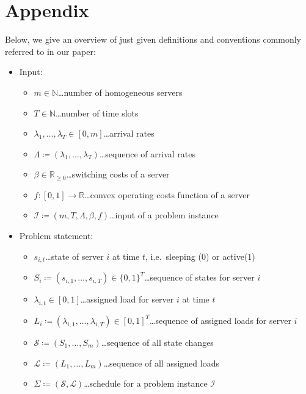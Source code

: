 \documentclass[hidelinks]{article}
\theoremstyle{plain}
\theoremstyle{definition}
\theoremstyle{rem}
\newcommand{\inp}{\mathcal{I}}
\begin{document}
\newpage


\newpage

\section*{Appendix}
Below, we give an overview of just given definitions and conventions commonly referred to in our paper:
\begin{itemize}
\item Input:
\begin{itemize}
	\item $m\in\mathbb{N}$\ldots number of homogeneous servers
	\item $T\in\mathbb{N}$\ldots number of time slots
	\item $\lambda_1,\ldots,\lambda_{T}\in[0,m]$\ldots arrival rates
	\item $\Lambda\coloneqq(\lambda_1,\ldots,\lambda_T)$\ldots sequence of arrival rates
	\item $\beta\in\mathbb{R}_{\ge 0}$\ldots switching costs of a server
	\item $f:[0,1]\rightarrow\mathbb{R}$\ldots convex operating costs function of a server
	\item $\inp\coloneqq(m,T,\Lambda,\beta,f)$\ldots input of a problem instance
\end{itemize}

\item Problem statement:
\begin{itemize}
	\item $s_{i,t}$\ldots state of server $i$ at time $t$, i.e.\ sleeping (0) or active(1)
	\item $S_i\coloneqq(s_{i,1},\ldots,s_{i,T})\in\{0,1\}^T$\ldots sequence of states for server $i$
	\item $\lambda_{i,t}\in[0,1]$\ldots assigned load for server $i$ at time $t$
	\item $L_i\coloneqq(\lambda_{i,1},\ldots,\lambda_{i,T})\in[0,1]^T$\ldots sequence of assigned loads for server $i$
	\item $\mathcal{S}\coloneqq(S_1,\ldots,S_m)$\ldots sequence of all state changes
	\item $\mathcal{L}\coloneqq(L_1,\ldots,L_m)$\ldots sequence of all assigned loads
	\item $\Sigma\coloneqq(\mathcal{S},\mathcal{L})$\ldots schedule for a problem instance $\inp$
\end{itemize}


\end{itemize}
\end{document}
